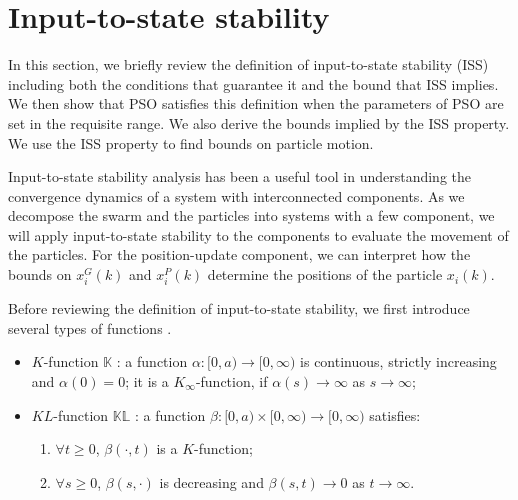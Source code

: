 \section{Input-to-state stability}
\label{sec:iss}


In this section, we briefly review the definition of input-to-state stability (ISS) including both the conditions that guarantee it and the bound that ISS implies\cite{Jiang2001857}. 
We then show that PSO satisfies this definition when the parameters of PSO are set in the requisite range.
We also derive the bounds implied by the ISS property.
We use the ISS property to find bounds on particle motion.

Input-to-state stability analysis has been a useful tool in understanding the convergence dynamics of a system with interconnected components.
As we decompose the swarm and the particles into systems with a few component, we will apply input-to-state stability to the components to evaluate the movement of the particles.
For the position-update component, we can interpret how the bounds on $ x^{G}_{i}(k) $ and $ x^{P}_{i}(k) $ determine the positions of the particle $ x_{i}(k) $.

Before reviewing the definition of input-to-state stability, we first introduce several types of functions \cite{Jiang2001857}.
\begin{itemize}
	\item $ K $-function $ \mathbb{K} $ : a function $ \alpha  : [ 0, a ) \rightarrow [ 0, \infty ) $ is continuous, strictly increasing and $ \alpha (0) = 0 $; it is a $ K_{\infty} $-function, if $ \alpha (s) \rightarrow \infty $ as $ s \rightarrow \infty $;
	\item $ KL $-function $ \mathbb{KL} $ : a function $ \beta : [ 0, a ) \times [ 0 , \infty ) \rightarrow [ 0, \infty ) $ satisfies:
	\begin{enumerate}
		\item $ \forall t \geq 0 $, $ \beta (\cdot , t ) $ is a $ K $-function;
		\item $ \forall s \geq 0 $, $ \beta (s, \cdot) $ is decreasing and $ \beta(s,t) \rightarrow 0 $ as $ t \rightarrow \infty $.
	\end{enumerate}
\end{itemize}

